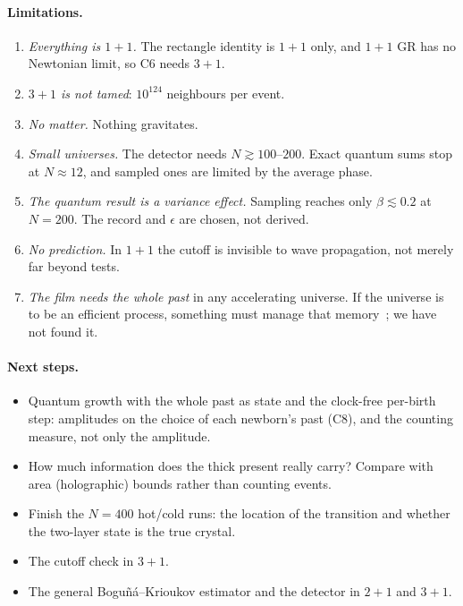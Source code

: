 \documentclass[11pt,a4paper]{article}
\begin{document}
\paragraph{Limitations.}
\begin{enumerate}[leftmargin=*,itemsep=1pt]
\item \emph{Everything is $1+1$.} The rectangle identity is $1+1$ only, and $1+1$ GR has no Newtonian limit, so C6 needs $3+1$.
\item \emph{$3+1$ is not tamed}: $10^{124}$ neighbours per event.
\item \emph{No matter.} Nothing gravitates.
\item \emph{Small universes.} The detector needs $N\gtrsim100$--$200$. Exact quantum sums stop at $N\approx12$, and sampled ones are limited by the average phase.
\item \emph{The quantum result is a variance effect.} Sampling reaches only $\beta\lesssim0.2$ at $N=200$. The record and $\epsilon$ are chosen, not derived.
\item \emph{No prediction.} In $1+1$ the cutoff is invisible to wave propagation, not merely far beyond tests.
\item \emph{The film needs the whole past} in any accelerating universe. If the universe is to be an efficient process, something must manage that memory~\cite{Lloyd02}; we have not found it.
\end{enumerate}

\paragraph{Next steps.}
\begin{itemize}[leftmargin=*,itemsep=1pt]
\item Quantum growth with the whole past as state and the clock-free per-birth step: amplitudes on the choice of each newborn's past (C8), and the counting measure, not only the amplitude.
\item How much information does the thick present really carry? Compare with area (holographic) bounds rather than counting events.
\item Finish the $N=400$ hot/cold runs: the location of the transition and whether the two-layer state is the true crystal.
\item The cutoff check in $3+1$.
\item The general Boguñá--Krioukov estimator and the detector in $2+1$ and $3+1$.
\end{itemize}
\end{document}
